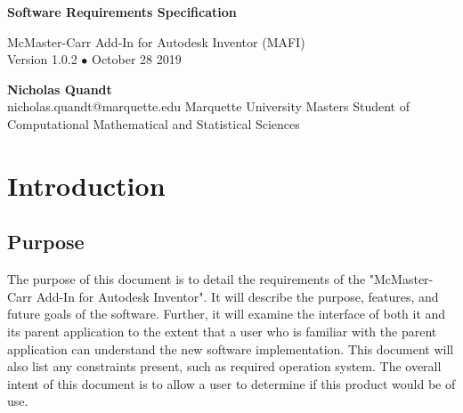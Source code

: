 \documentclass[12pt, letterpaper]{article}
\begin{document}
\begin{titlepage}
   \begin{flushright}
       \vspace*{5cm}
 
       {\Huge \textbf{Software Requirements Specification}}
 
       \vspace{0.5cm}
        McMaster-Carr Add-In for Autodesk Inventor (MAFI)\\
        Version 1.0.2 $\bullet$ October 28 2019
 
       \vspace{1.5cm}
 
       \textbf{Nicholas Quandt}
       \\
       nicholas.quandt@marquette.edu
       \vfill
       Marquette University Masters Student of\\
       Computational Mathematical and Statistical Sciences\\
       \vspace{1cm}
 
   \end{flushright}
\end{titlepage}


\tableofcontents
\newpage

\section{Introduction}
\subsection{Purpose}
The purpose of this document is to detail the requirements of the "McMaster-Carr Add-In for Autodesk Inventor". It will describe the purpose, features, and future goals of the software. Further, it will examine the interface of both it and its parent application to the extent that a user who is familiar with the parent application can understand the new software implementation. This document will also list any constraints present, such as required operation system. The overall intent of this document is to allow a user to determine if this product would be of use.
\end{document}
